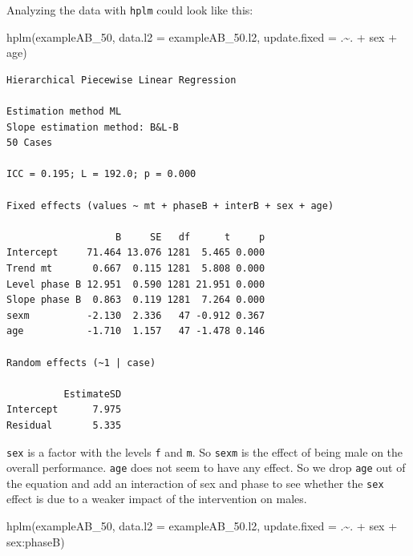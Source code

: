 \documentclass[
]{book}
\newenvironment{Shaded}{\begin{snugshade}}{\end{snugshade}}
\newcommand{\AttributeTok}[1]{\textcolor[rgb]{0.77,0.63,0.00}{#1}}
\newcommand{\FunctionTok}[1]{\textcolor[rgb]{0.00,0.00,0.00}{#1}}
\newcommand{\NormalTok}[1]{#1}
\newcommand{\SpecialCharTok}[1]{\textcolor[rgb]{0.00,0.00,0.00}{#1}}
\begin{document}
Analyzing the data with \texttt{hplm} could look like this:

\begin{Shaded}
\begin{Highlighting}[]
\FunctionTok{hplm}\NormalTok{(exampleAB\_50, }\AttributeTok{data.l2 =}\NormalTok{ exampleAB\_50.l2, }\AttributeTok{update.fixed =}\NormalTok{ .}\SpecialCharTok{\textasciitilde{}}\NormalTok{. }\SpecialCharTok{+}\NormalTok{ sex }\SpecialCharTok{+}\NormalTok{ age)}
\end{Highlighting}
\end{Shaded}

\begin{verbatim}
Hierarchical Piecewise Linear Regression

Estimation method ML 
Slope estimation method: B&L-B 
50 Cases

ICC = 0.195; L = 192.0; p = 0.000

Fixed effects (values ~ mt + phaseB + interB + sex + age)

                   B     SE   df      t     p
Intercept     71.464 13.076 1281  5.465 0.000
Trend mt       0.667  0.115 1281  5.808 0.000
Level phase B 12.951  0.590 1281 21.951 0.000
Slope phase B  0.863  0.119 1281  7.264 0.000
sexm          -2.130  2.336   47 -0.912 0.367
age           -1.710  1.157   47 -1.478 0.146

Random effects (~1 | case)

          EstimateSD
Intercept      7.975
Residual       5.335
\end{verbatim}

\texttt{sex} is a factor with the levels \texttt{f} and \texttt{m}. So \texttt{sexm} is the effect of being male on the overall performance. \texttt{age} does not seem to have any effect. So we drop \texttt{age} out of the equation and add an interaction of sex and phase to see whether the \texttt{sex} effect is due to a weaker impact of the intervention on males.

\begin{Shaded}
\begin{Highlighting}[]
\FunctionTok{hplm}\NormalTok{(exampleAB\_50, }\AttributeTok{data.l2 =}\NormalTok{ exampleAB\_50.l2, }\AttributeTok{update.fixed =}\NormalTok{ .}\SpecialCharTok{\textasciitilde{}}\NormalTok{. }\SpecialCharTok{+}\NormalTok{ sex }\SpecialCharTok{+}\NormalTok{ sex}\SpecialCharTok{:}\NormalTok{phaseB)}
\end{Highlighting}
\end{Shaded}
\end{document}
